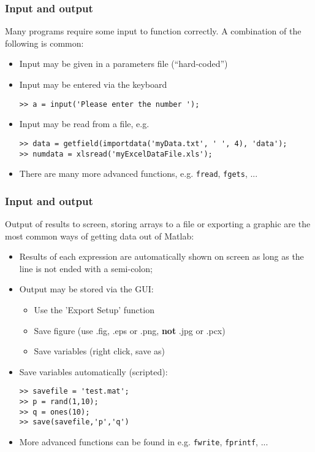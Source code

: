 \begin{frame}[fragile]
 \frametitle{Input and output}
 Many programs require some input to function correctly. A combination of the following is common:
 \begin{itemize}[<+->]
   \item Input may be given in a parameters file (``hard-coded'')
   \item Input may be entered via the keyboard
   \begin{lstlisting}
>> a = input('Please enter the number ');
   \end{lstlisting}
   \item Input may be read from a file, e.g.
    \begin{lstlisting}
>> data = getfield(importdata('myData.txt', ' ', 4), 'data');
>> numdata = xlsread('myExcelDataFile.xls');
   \end{lstlisting}
   \item There are many more advanced functions, e.g. \lstinline$fread$, \lstinline$fgets$, ...
 \end{itemize}
\end{frame}

\begin{frame}[fragile]
 \frametitle{Input and output}
 Output of results to screen, storing arrays to a file or exporting a graphic are the most common ways of getting data out of Matlab:
 \begin{itemize}[<+->]
   \item Results of each expression are automatically shown on screen as long as the line is not ended with a semi-colon;
   \item Output may be stored via the GUI:
    \begin{itemize}
      \item Use the 'Export Setup' function
      \item Save figure (use .fig, .eps or .png, \textbf{not} .jpg or .pcx)
      \item Save variables (right click, save as)
    \end{itemize}
   \item Save variables automatically (scripted):
    \begin{lstlisting}
>> savefile = 'test.mat';
>> p = rand(1,10);
>> q = ones(10);
>> save(savefile,'p','q')
   \end{lstlisting}
   \item More advanced functions can be found in e.g.  \lstinline$fwrite$, \lstinline$fprintf$, ...
 \end{itemize}
\end{frame}

